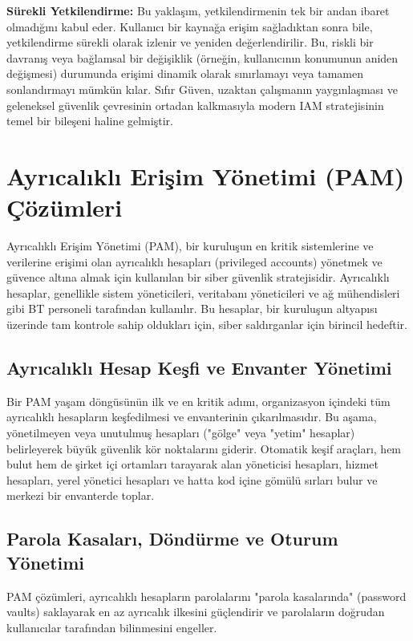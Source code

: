 \textbf{Sürekli Yetkilendirme:} Bu yaklaşım, yetkilendirmenin tek bir andan ibaret olmadığını kabul eder. Kullanıcı bir kaynağa erişim sağladıktan sonra bile, yetkilendirme sürekli olarak izlenir ve yeniden değerlendirilir. Bu, riskli bir davranış veya bağlamsal bir değişiklik (örneğin, kullanıcının konumunun aniden değişmesi) durumunda erişimi dinamik olarak sınırlamayı veya tamamen sonlandırmayı mümkün kılar. Sıfır Güven, uzaktan çalışmanın yaygınlaşması ve geleneksel güvenlik çevresinin ortadan kalkmasıyla modern IAM stratejisinin temel bir bileşeni haline gelmiştir.

\section{Ayrıcalıklı Erişim Yönetimi (PAM) Çözümleri}
Ayrıcalıklı Erişim Yönetimi (PAM), bir kuruluşun en kritik sistemlerine ve verilerine erişimi olan ayrıcalıklı hesapları (privileged accounts) yönetmek ve güvence altına almak için kullanılan bir siber güvenlik stratejisidir. Ayrıcalıklı hesaplar, genellikle sistem yöneticileri, veritabanı yöneticileri ve ağ mühendisleri gibi BT personeli tarafından kullanılır. Bu hesaplar, bir kuruluşun altyapısı üzerinde tam kontrole sahip oldukları için, siber saldırganlar için birincil hedeftir.

\subsection{Ayrıcalıklı Hesap Keşfi ve Envanter Yönetimi}

Bir PAM yaşam döngüsünün ilk ve en kritik adımı, organizasyon içindeki tüm ayrıcalıklı hesapların keşfedilmesi ve envanterinin çıkarılmasıdır. Bu aşama, yönetilmeyen veya unutulmuş hesapları ("gölge" veya "yetim" hesaplar) belirleyerek büyük güvenlik kör noktalarını giderir. Otomatik keşif araçları, hem bulut hem de şirket içi ortamları tarayarak alan yöneticisi hesapları, hizmet hesapları, yerel yönetici hesapları ve hatta kod içine gömülü sırları bulur ve merkezi bir envanterde toplar.

\subsection{Parola Kasaları, Döndürme ve Oturum Yönetimi}

PAM çözümleri, ayrıcalıklı hesapların parolalarını "parola kasalarında" (password vaults) saklayarak en az ayrıcalık ilkesini güçlendirir ve parolaların doğrudan kullanıcılar tarafından bilinmesini engeller.

